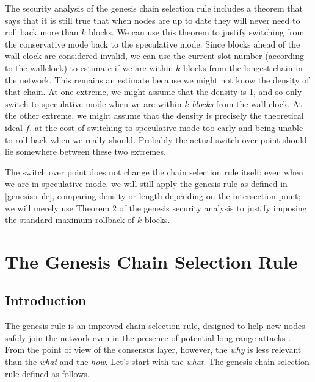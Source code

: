 The security analysis of the genesis chain selection rule includes a theorem
\cite[Theorem 2]{cryptoeprint:2018:378} that says that it is still true that
when nodes are up to date they will never need to roll back more than $k$
blocks. We can use this theorem to justify switching from the conservative
mode back to the speculative mode. Since blocks ahead of the wall clock are
considered invalid, we can use the current slot number (according to the
wallclock) to estimate if we are within $k$ blocks from the longest chain
in the network. This remains an estimate because we might not know the
density of that chain. At one extreme, we might assume that the density is
1, and so only switch to speculative mode when we are within $k$ \emph{blocks}
from the wall clock. At the other extreme, we might assume that the density is
precisely the theoretical ideal $f$, at the cost of switching to speculative
mode too early and being unable to roll back when we really should. Probably
the actual switch-over point should lie somewhere between these two extremes.

The switch over point does not change the chain selection rule itself: even when
we are in speculative mode, we will still apply the genesis rule as defined in
\cref{genesis:rule}, comparing density or length depending on the intersection
point; we will merely use Theorem 2 of the genesis security analysis to justify
imposing the standard maximum rollback of $k$ blocks.


\pagebreak
{}

\section{The Genesis Chain Selection Rule}

\subsection{Introduction}

The genesis rule is an improved chain selection rule, designed to help new nodes
safely join the network even in the presence of potential long range attacks
\cite{cryptoeprint:2018:378}. From the point of view of the consensus layer,
however, the \emph{why} is less relevant than the \emph{what} and the
\emph{how}. Let's start with the \emph{what}. The genesis chain selection
rule defined as follows.

